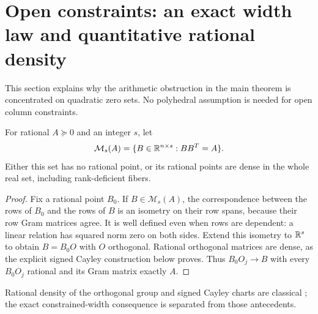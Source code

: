 \section{Open constraints: an exact width law and quantitative rational density}
This section explains why the arithmetic obstruction in the main theorem is concentrated on quadratic zero sets. No polyhedral assumption is needed for open column constraints.

\begin{theorem}\label{thm:orbit}
For rational $A\succeq0$ and an integer $s$, let
\[
 \mathcal M_s(A)=\{B\in\mathbb R^{n\times s}:BB^T=A\}.
\]
Either this set has no rational point, or its rational points are dense in the whole real set, including rank-deficient fibers.
\end{theorem}
\begin{proof}
Fix a rational point $B_0$. If $B\in\mathcal M_s(A)$, the correspondence between the rows of $B_0$ and the rows of $B$ is an isometry on their row spans, because their row Gram matrices agree. It is well defined even when rows are dependent: a linear relation has squared norm zero on both sides. Extend this isometry to $\mathbb R^s$ to obtain $B=B_0O$ with $O$ orthogonal. Rational orthogonal matrices are dense, as the explicit signed Cayley construction below proves. Thus $B_0O_j\to B$ with every $B_0O_j$ rational and its Gram matrix exactly $A$.
\end{proof}
Rational density of the orthogonal group and signed Cayley charts are classical \cite{Schmutz,TWZ}; the exact constrained-width consequence is separated from those antecedents.

